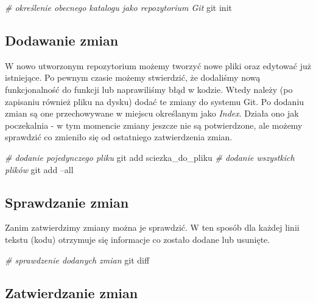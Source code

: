 \documentclass[paper=6in:9in,pagesize=pdftex,headinclude=on,footinclude=on,10pt]{scrbook}
\newenvironment{Shaded}{\begin{snugshade}}{\end{snugshade}}
\newcommand{\CommentTok}[1]{\textcolor[rgb]{0.56,0.35,0.01}{\textit{#1}}}
\newcommand{\FunctionTok}[1]{\textcolor[rgb]{0.00,0.00,0.00}{#1}}
\newcommand{\NormalTok}[1]{#1}
\begin{document}
\begin{Shaded}
\begin{Highlighting}[]
\CommentTok{# określenie obecnego katalogu jako repozytorium Git}
\FunctionTok{git}\NormalTok{ init                  }
\end{Highlighting}
\end{Shaded}

\hypertarget{dodawanie-zmian}{%
\subsection{Dodawanie zmian}\label{dodawanie-zmian}}

W nowo utworzonym repozytorium możemy tworzyć nowe pliki oraz edytować już istniejące.
Po pewnym czasie możemy stwierdzić, że dodaliśmy nową funkcjonalność do funkcji lub naprawiliśmy błąd w kodzie.
Wtedy należy (po zapisaniu również pliku na dysku) dodać te zmiany do systemu Git.
Po dodaniu zmian są one przechowywane w miejscu określanym jako \emph{Index}.
Działa ono jak poczekalnia - w tym momencie zmiany jeszcze nie są potwierdzone, ale możemy sprawdzić co zmieniło się od ostatniego zatwierdzenia zmian.

\begin{Shaded}
\begin{Highlighting}[]
\CommentTok{# dodanie pojedynczego pliku}
\FunctionTok{git}\NormalTok{ add sciezka_do_pliku  }
\CommentTok{# dodanie wszystkich plików }
\FunctionTok{git}\NormalTok{ add --all                    }
\end{Highlighting}
\end{Shaded}

\hypertarget{sprawdzanie-zmian}{%
\subsection{Sprawdzanie zmian}\label{sprawdzanie-zmian}}

Zanim zatwierdzimy zmiany można je sprawdzić.
W ten sposób dla każdej linii tekstu (kodu) otrzymuje się informacje co zostało dodane lub usunięte.

\begin{Shaded}
\begin{Highlighting}[]
\CommentTok{# sprawdzenie dodanych zmian}
\FunctionTok{git}\NormalTok{ diff                  }
\end{Highlighting}
\end{Shaded}

\hypertarget{zatwierdzanie-zmian}{%
\subsection{Zatwierdzanie zmian}\label{zatwierdzanie-zmian}}
\end{document}
